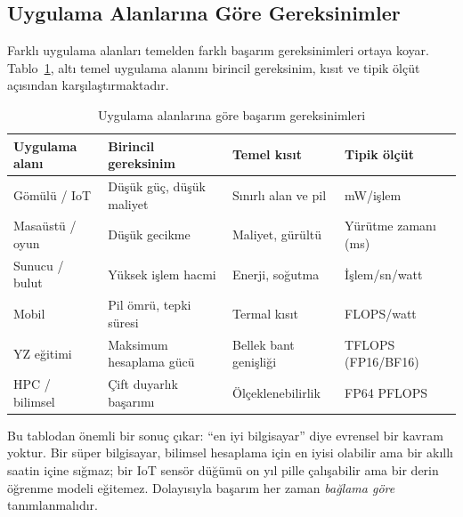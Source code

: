 \subsection{Uygulama Alanlarına Göre Gereksinimler}
\label{subsec:uygulama-gereksinimleri}

Farklı uygulama alanları temelden farklı başarım gereksinimleri ortaya koyar. Tablo~\ref{tab:gereksinim-matrisi}, altı temel uygulama alanını birincil gereksinim, kısıt ve tipik ölçüt açısından karşılaştırmaktadır.

\begin{table}[H]
\centering
\caption{Uygulama alanlarına göre başarım gereksinimleri}
\label{tab:gereksinim-matrisi}
\small
\begin{tabular}{lp{2.8cm}p{2.8cm}p{2.8cm}}
\toprule
\textbf{Uygulama alanı} & \textbf{Birincil gereksinim} & \textbf{Temel kısıt} & \textbf{Tipik ölçüt} \\
\midrule
Gömülü / IoT          & Düşük güç, düşük maliyet & Sınırlı alan ve pil & mW/işlem \\
Masaüstü / oyun       & Düşük gecikme            & Maliyet, gürültü     & Yürütme zamanı (ms) \\
Sunucu / bulut        & Yüksek işlem hacmi             & Enerji, soğutma      & İşlem/sn/watt \\
Mobil                 & Pil ömrü, tepki süresi   & Termal kısıt         & FLOPS/watt \\
YZ eğitimi            & Maksimum hesaplama gücü  & Bellek bant genişliği & TFLOPS (FP16/BF16) \\
HPC / bilimsel        & Çift duyarlık başarımı   & Ölçeklenebilirlik    & FP64 PFLOPS \\
\bottomrule
\end{tabular}
\end{table}

Bu tablodan önemli bir sonuç çıkar: ``en iyi bilgisayar'' diye evrensel bir kavram yoktur. Bir süper bilgisayar, bilimsel hesaplama için en iyisi olabilir ama bir akıllı saatin içine sığmaz; bir IoT sensör düğümü on yıl pille çalışabilir ama bir derin öğrenme modeli eğitemez. Dolayısıyla başarım her zaman \emph{bağlama göre} tanımlanmalıdır.


